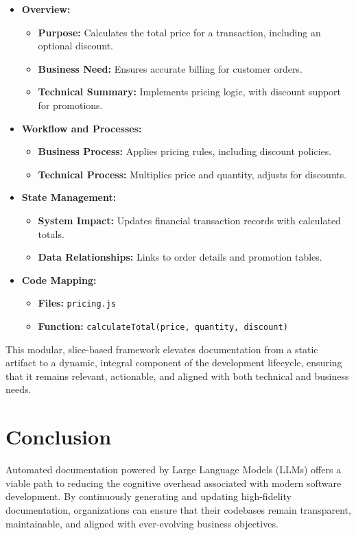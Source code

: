 \documentclass[12pt,oneside]{article}
\begin{document}
\begin{itemize}
    \item \textbf{Overview:}
        \begin{itemize}
            \item \textbf{Purpose:} Calculates the total price for a transaction, including an optional discount.
            \item \textbf{Business Need:} Ensures accurate billing for customer orders.
            \item \textbf{Technical Summary:} Implements pricing logic, with discount support for promotions.
        \end{itemize}
    \item \textbf{Workflow and Processes:}
        \begin{itemize}
            \item \textbf{Business Process:} Applies pricing rules, including discount policies.
            \item \textbf{Technical Process:} Multiplies price and quantity, adjusts for discounts.
        \end{itemize}
    \item \textbf{State Management:}
        \begin{itemize}
            \item \textbf{System Impact:} Updates financial transaction records with calculated totals.
            \item \textbf{Data Relationships:} Links to order details and promotion tables.
        \end{itemize}
    \item \textbf{Code Mapping:}
        \begin{itemize}
            \item \textbf{Files:} \texttt{pricing.js}
            \item \textbf{Function:} \texttt{calculateTotal(price, quantity, discount)}
        \end{itemize}
\end{itemize}

This modular, slice-based framework elevates documentation from a static artifact to a dynamic, integral
component of the development lifecycle, ensuring that it remains relevant, actionable, and aligned with 
both technical and business needs.


\section{Conclusion}
Automated documentation powered by Large Language Models (LLMs) offers a viable path to reducing the cognitive overhead 
associated with modern software development. 
By continuously generating and updating high-fidelity documentation, organizations can ensure that their codebases 
remain transparent, maintainable, and aligned with ever-evolving business objectives. 
\end{document}
